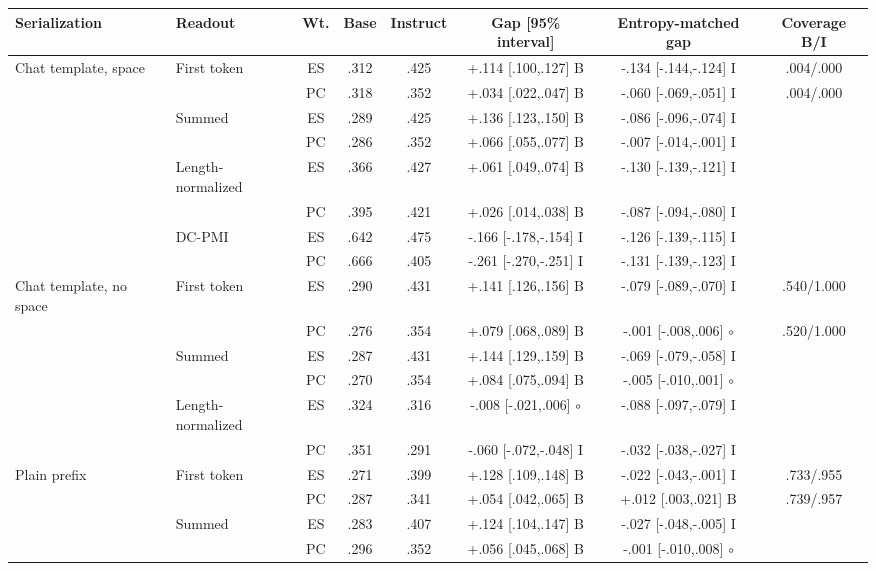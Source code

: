 \begin{table}[t]
\centering\scriptsize
\setlength{\tabcolsep}{2.3pt}
\begin{tabular}{@{}llcccccc@{}}
\toprule
Serialization & Readout & Wt. & Base & Instruct & Gap [95\% interval] & Entropy-matched gap & Coverage B/I \\
\midrule
Chat template, space & First token & ES & .312 & .425 & +.114 [.100,.127] B & -.134 [-.144,-.124] I & .004/.000 \\
 &  & PC & .318 & .352 & +.034 [.022,.047] B & -.060 [-.069,-.051] I & .004/.000 \\
 & Summed & ES & .289 & .425 & +.136 [.123,.150] B & -.086 [-.096,-.074] I &  \\
 &  & PC & .286 & .352 & +.066 [.055,.077] B & -.007 [-.014,-.001] I &  \\
 & Length-normalized & ES & .366 & .427 & +.061 [.049,.074] B & -.130 [-.139,-.121] I &  \\
 &  & PC & .395 & .421 & +.026 [.014,.038] B & -.087 [-.094,-.080] I &  \\
 & DC-PMI & ES & .642 & .475 & -.166 [-.178,-.154] I & -.126 [-.139,-.115] I &  \\
 &  & PC & .666 & .405 & -.261 [-.270,-.251] I & -.131 [-.139,-.123] I &  \\
Chat template, no space & First token & ES & .290 & .431 & +.141 [.126,.156] B & -.079 [-.089,-.070] I & .540/1.000 \\
 &  & PC & .276 & .354 & +.079 [.068,.089] B & -.001 [-.008,.006] $\circ$ & .520/1.000 \\
 & Summed & ES & .287 & .431 & +.144 [.129,.159] B & -.069 [-.079,-.058] I &  \\
 &  & PC & .270 & .354 & +.084 [.075,.094] B & -.005 [-.010,.001] $\circ$ &  \\
 & Length-normalized & ES & .324 & .316 & -.008 [-.021,.006] $\circ$ & -.088 [-.097,-.079] I &  \\
 &  & PC & .351 & .291 & -.060 [-.072,-.048] I & -.032 [-.038,-.027] I &  \\
Plain prefix & First token & ES & .271 & .399 & +.128 [.109,.148] B & -.022 [-.043,-.001] I & .733/.955 \\
 &  & PC & .287 & .341 & +.054 [.042,.065] B & +.012 [.003,.021] B & .739/.957 \\
 & Summed & ES & .283 & .407 & +.124 [.104,.147] B & -.027 [-.048,-.005] I &  \\
 &  & PC & .296 & .352 & +.056 [.045,.068] B & -.001 [-.010,.008] $\circ$ &  \\

\end{tabular}
\end{table}
